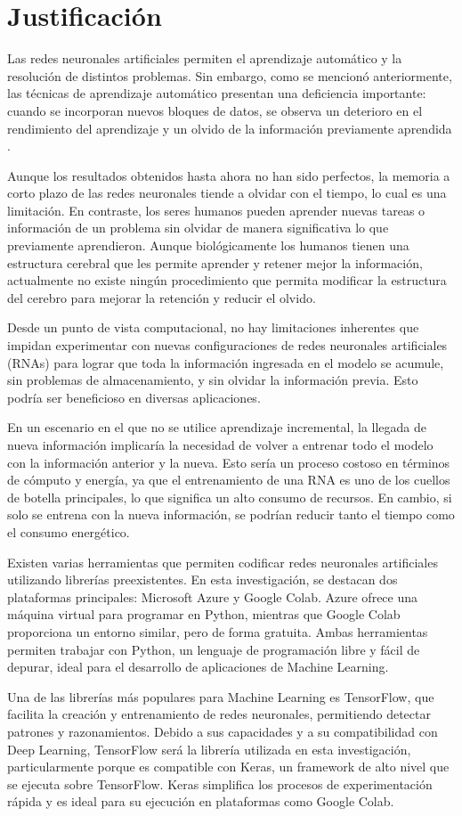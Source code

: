\section{Justificación}

Las redes neuronales artificiales permiten el aprendizaje automático y la resolución de distintos problemas. Sin embargo, como se mencionó anteriormente, las técnicas de aprendizaje automático presentan una deficiencia importante: cuando se incorporan nuevos bloques de datos, se observa un deterioro en el rendimiento del aprendizaje y un olvido de la información previamente aprendida \cite{bullinaria2009}. 

Aunque los resultados obtenidos hasta ahora no han sido perfectos, la memoria a corto plazo de las redes neuronales tiende a olvidar con el tiempo, lo cual es una limitación. En contraste, los seres humanos pueden aprender nuevas tareas o información de un problema sin olvidar de manera significativa lo que previamente aprendieron. Aunque biológicamente los humanos tienen una estructura cerebral que les permite aprender y retener mejor la información, actualmente no existe ningún procedimiento que permita modificar la estructura del cerebro para mejorar la retención y reducir el olvido.

Desde un punto de vista computacional, no hay limitaciones inherentes que impidan experimentar con nuevas configuraciones de redes neuronales artificiales (RNAs) para lograr que toda la información ingresada en el modelo se acumule, sin problemas de almacenamiento, y sin olvidar la información previa. Esto podría ser beneficioso en diversas aplicaciones.

En un escenario en el que no se utilice aprendizaje incremental, la llegada de nueva información implicaría la necesidad de volver a entrenar todo el modelo con la información anterior y la nueva. Esto sería un proceso costoso en términos de cómputo y energía, ya que el entrenamiento de una RNA es uno de los cuellos de botella principales, lo que significa un alto consumo de recursos. En cambio, si solo se entrena con la nueva información, se podrían reducir tanto el tiempo como el consumo energético.

Existen varias herramientas que permiten codificar redes neuronales artificiales utilizando librerías preexistentes. En esta investigación, se destacan dos plataformas principales: Microsoft Azure y Google Colab. Azure ofrece una máquina virtual para programar en Python, mientras que Google Colab proporciona un entorno similar, pero de forma gratuita. Ambas herramientas permiten trabajar con Python, un lenguaje de programación libre y fácil de depurar, ideal para el desarrollo de aplicaciones de Machine Learning.

Una de las librerías más populares para Machine Learning es TensorFlow, que facilita la creación y entrenamiento de redes neuronales, permitiendo detectar patrones y razonamientos. Debido a sus capacidades y a su compatibilidad con Deep Learning, TensorFlow será la librería utilizada en esta investigación, particularmente porque es compatible con Keras, un framework de alto nivel que se ejecuta sobre TensorFlow. Keras simplifica los procesos de experimentación rápida y es ideal para su ejecución en plataformas como Google Colab.

